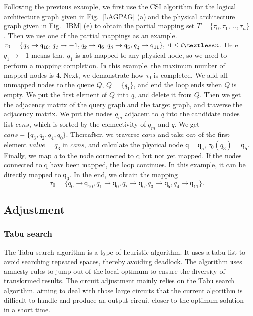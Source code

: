 \documentclass[runningheads]{llncs}
\begin{document}
\begin{example}
	Following the previous example, we first use the CSI algorithm for the logical architecture graph given in Fig.~\ref{LAGPAG} (a) and the physical architecture graph given in Fig.~\ref{IBM} (e) to obtain the partial mapping set $T=\{\tau_{0},\tau_{1},...,\tau_{n}\}$. Then we use one of the partial mappings as an example.
	$\tau_{0}=\{\textit{q}_\textit{0}\rightarrow \textsf{q}_{\textsf{10}},\textit{q}_\textit{1}\rightarrow -1,
	\textit{q}_\textit{2}\rightarrow \textsf{q}_{\textsf{6}},\textit{q}_\textit{3}\rightarrow \textsf{q}_{\textsf{5}},\textit{q}_\textit{4}\rightarrow \textsf{q}_{\textsf{11}}\}, \ 0 \le i \textless n$. 
Here $\textit{q}_\textit{1}\rightarrow -1$ means that $\textit{q}_\textit{1}$ is not mapped to any physical node, so we need to perform a mapping completion. In this example, the maximum number of mapped nodes is 4. Next, we demonstrate how $\tau_{0}$ is completed. We add all unmapped nodes to the queue $Q, \ Q=\{\textit{q}_\textit{1}\}$, and end the loop ends when $Q$ is empty. We put the first element of $Q$ into \textit{q}, and delete it from $Q$.  
Then we get the adjacency matrix of the query graph and the target graph, and traverse the adjacency matrix. We put the nodes  $\textit{q}_\textit{m}$ adjacent to \textit{q} into the candidate nodes list $cans$, which is sorted by the connectivity of $\textit{q}_\textit{m}$ and \textit{q}. We get $cans=\{\textit{q}_\textit{3},\textit{q}_\textit{2},\textit{q}_\textit{4},\textit{q}_\textit{0}\}$. Thereafter, we traverse $cans$ and take out of the first element $value=\textit{q}_\textit{3}$ in $cans$, and calculate the phycical node $\textsf{q}=\textsf{q}_{\textsf{5}}$, $\tau_0(\textit{q}_\textit{3})=\textsf{q}_{\textsf{5}}$. Finally, we map \textit{q} to the node connected to \textsf{q} but not yet mapped. If the nodes connected to \textsf{q} have been mapped, the loop continues. In this example, it can be directly mapped to $\textsf{q}_{\textsf{0}}$. In the end, we obtain the mapping $$ \tau_{0}=\{\textit{q}_\textit{0}\rightarrow  \textsf{q}_{10},\textit{q}_\textit{1}\rightarrow \textsf{q}_{0},	\textit{q}_\textit{2}\rightarrow  \textsf{q}_{\textsf{6}},\textit{q}_\textit{3}\rightarrow  \textsf{q}_{\textsf{5}},\textit{q}_\textit{4}\rightarrow  \textsf{q}_{\textsf{11}}\}. $$
	\end{example}
\subsection{Adjustment}
\subsubsection{Tabu search}
The Tabu search algorithm is a type of heuristic algorithm. It uses a tabu list to avoid searching repeated spaces, thereby avoiding deadlock. The algorithm uses amnesty rules to jump out of the local optimum to ensure the diversity of transformed results. The circuit adjustment mainly relies on the Tabu search algorithm, aiming to deal with those large circuits that the current algorithm is difficult to handle and produce an output circuit closer to the optimum solution in a short time.
\end{document}
